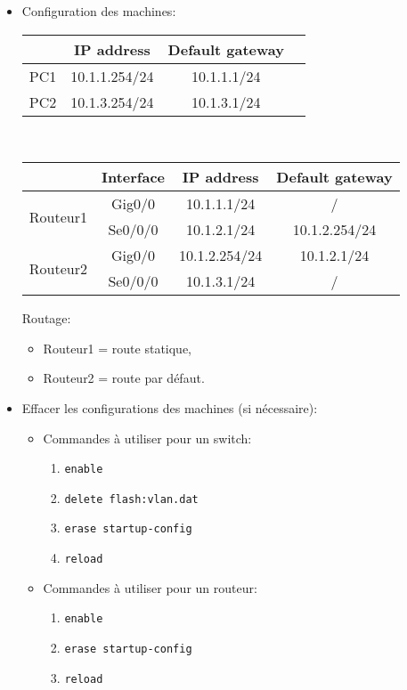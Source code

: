 \documentclass[a4paper]{article}
\begin{document}
\begin{itemize}
\item Configuration des machines:
\begin{center}
    \begin{tabular}{|c|c|c|c|} \hline
        & IP address & Default gateway \\ \hline
        PC1 & 10.1.1.254/24 & 10.1.1.1/24 \\ \hline
        PC2 & 10.1.3.254/24 & 10.1.3.1/24 \\ \hline
    \end{tabular}
    \\
    \begin{tabular}{|c|c|c|c|} \hline
        & Interface & IP address & Default gateway \\ \hline
        \multirow{2}{*}{Routeur1} & Gig0/0 & 10.1.1.1/24 & / \\
        & Se0/0/0 & 10.1.2.1/24 & 10.1.2.254/24 \\ \hline
        \multirow{2}{*}{Routeur2} & Gig0/0 & 10.1.2.254/24 & 10.1.2.1/24 \\
        & Se0/0/0 & 10.1.3.1/24 & / \\ \hline
    \end{tabular}
\end{center}

Routage:
\begin{itemize}
    \item Routeur1 = route statique,
    \item Routeur2 = route par défaut.
\end{itemize}





\item Effacer les configurations des machines (si nécessaire):
\begin{itemize}
    \item Commandes à utiliser pour un switch:
    \begin{enumerate}
        \item \texttt{enable}
        \item \texttt{delete flash:vlan.dat}
        \item \texttt{erase startup-config}
        \item \texttt{reload}
    \end{enumerate}
    \item Commandes à utiliser pour un routeur:
    \begin{enumerate}
        \item \texttt{enable}
        \item \texttt{erase startup-config}
        \item \texttt{reload}
    \end{enumerate}
\end{itemize}






\end{itemize}
\end{document}
